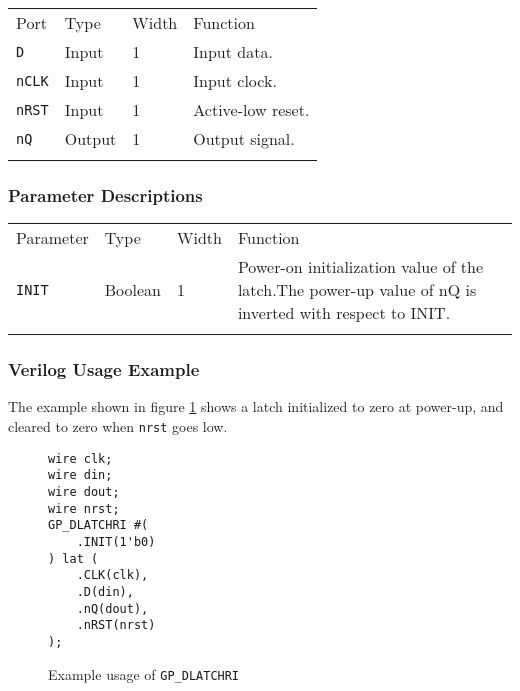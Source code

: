 \documentclass[11pt]{article}
\newcommand{\tokenstyle}[1]{\texttt{#1}}
\newcommand{\wirestyle}[1]{\texttt{#1}}
\newcommand{\whenstyle}[1]{{\fontseries{sb}\selectfont#1}}
\newcommand{\thinhline}{\Xhline{1\arrayrulewidth}}
\newcommand{\thickhline}{\Xhline{2.5\arrayrulewidth}}
\begin{document}
\begin{tabularx}{\textwidth}{lllX}
\thinhline
\whenstyle{Port} & \whenstyle{Type} & \whenstyle{Width} & \whenstyle{Function} \\
\thickhline
\tokenstyle{D} & Input & 1 & Input data. \\
\thinhline
\tokenstyle{nCLK} & Input & 1 & Input clock. \\
\thinhline
\tokenstyle{nRST} & Input & 1 & Active-low reset. \\
\thinhline
\tokenstyle{nQ} & Output & 1 & Output signal. \\
\thinhline
\end{tabularx}

\subsubsection{Parameter Descriptions}

\begin{tabularx}{\textwidth}{lllX}
\thinhline
\whenstyle{Parameter} & \whenstyle{Type} & \whenstyle{Width} & \whenstyle{Function} \\
\thickhline
\tokenstyle{INIT} & Boolean & 1 & Power-on initialization value of the latch.\newline The power-up value of nQ is
inverted with respect to INIT.\\
\thinhline
\end{tabularx}

\subsubsection{Verilog Usage Example}

The example shown in figure \ref{gp-dlatchri-example} shows a latch initialized to zero at power-up, and cleared to zero
when \wirestyle{nrst} goes low.

\begin{figure}[h]
\begin{lstlisting}
wire clk;
wire din;
wire dout;
wire nrst;
GP_DLATCHRI #(
	.INIT(1'b0)
) lat (
	.CLK(clk),
	.D(din),
	.nQ(dout),
	.nRST(nrst)
);
\end{lstlisting}
\caption{Example usage of \tokenstyle{GP\_DLATCHRI}}
\label{gp-dlatchri-example}
\end{figure}


\pagebreak
\end{document}
